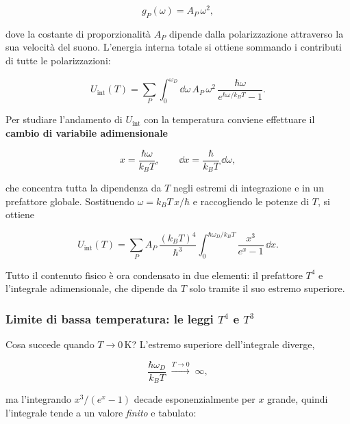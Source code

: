 \begin{equation}
    g_P(\omega) = A_P \, \omega^{2},
\end{equation}

dove la costante di proporzionalità \( A_P \) dipende dalla polarizzazione attraverso la sua velocità del suono. L'energia interna totale si ottiene sommando i contributi di tutte le polarizzazioni:

\begin{equation}
    U_{\text{int}}(T) = \sum_{P} \int_0^{\omega_D} \dd \omega \, A_P \, \omega^{2} \, \frac{\hbar \omega}{e^{\hbar \omega / k_B T} - 1}.
\end{equation}

Per studiare l'andamento di \( U_{\text{int}} \) con la temperatura conviene effettuare il \textbf{cambio di variabile adimensionale}

\begin{equation}
    x = \frac{\hbar \omega}{k_B T}, \qquad \dd x = \frac{\hbar}{k_B T} \, \dd \omega,
\end{equation}

che concentra tutta la dipendenza da \( T \) negli estremi di integrazione e in un prefattore globale. Sostituendo \( \omega = k_B T \, x / \hbar \) e raccogliendo le potenze di \( T \), si ottiene

\begin{equation}
    U_{\text{int}}(T) = \sum_{P} A_P \, \frac{(k_B T)^{4}}{\hbar^{3}} \int_{0}^{\hbar \omega_D / k_B T} \frac{x^{3}}{e^{x} - 1} \, \dd x.
\end{equation}

Tutto il contenuto fisico è ora condensato in due elementi: il prefattore \( T^{4} \) e l'integrale adimensionale, che dipende da \( T \) solo tramite il suo estremo superiore.

\subsubsection{Limite di bassa temperatura: le leggi \texorpdfstring{\( T^{4} \)}{T\^{}4} e \texorpdfstring{\( T^{3} \)}{T\^{}3}}

Cosa succede quando \( T \to 0 \, \text{K} \)? L'estremo superiore dell'integrale diverge,

\begin{equation}
    \frac{\hbar \omega_D}{k_B T} \;\xrightarrow{T \to 0}\; \infty,
\end{equation}

ma l'integrando \( x^{3}/(e^{x} - 1) \) decade esponenzialmente per \( x \) grande, quindi l'integrale tende a un valore \emph{finito} e tabulato:


